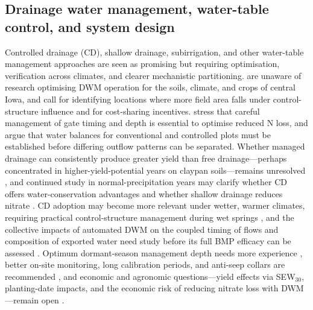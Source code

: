\documentclass[11pt]{article}
\begin{document}
\subsection{Drainage water management, water-table control, and system design}

Controlled drainage (CD), shallow drainage, subirrigation, and other water-table management approaches are seen as promising but requiring optimisation, verification across climates, and clearer mechanistic partitioning. \textcite{Jaynes2012} are unaware of research optimising DWM operation for the soils, climate, and crops of central Iowa, and call for identifying locations where more field area falls under control-structure influence and for cost-sharing incentives. \textcite{Fang2012} stress that careful management of gate timing and depth is essential to optimise reduced N loss, and \textcite{Wesström2001} argue that water balances for conventional and controlled plots must be established before differing outflow patterns can be separated. Whether managed drainage can consistently produce greater yield than free drainage---perhaps concentrated in higher-yield-potential years on claypan soils---remains unresolved \parencite{Nash2015,Nelson2011}, and continued study in normal-precipitation years may clarify whether CD offers water-conservation advantages and whether shallow drainage reduces nitrate \parencite{Smith2011b}. CD adoption may become more relevant under wetter, warmer climates, requiring practical control-structure management during wet springs \parencite{Madramootoo2024}, and the collective impacts of automated DWM on the coupled timing of flows and composition of exported water need study before its full BMP efficacy can be assessed \parencite{Miller2022}. Optimum dormant-season management depth needs more experience \parencite{Adeuya2012}, better on-site monitoring, long calibration periods, and anti-seep collars are recommended \parencite{Gunn2015}, and economic and agronomic questions---yield effects via SEW$_{30}$, planting-date impacts, and the economic risk of reducing nitrate loss with DWM---remain open \parencite{Schott2017b}.
\end{document}
